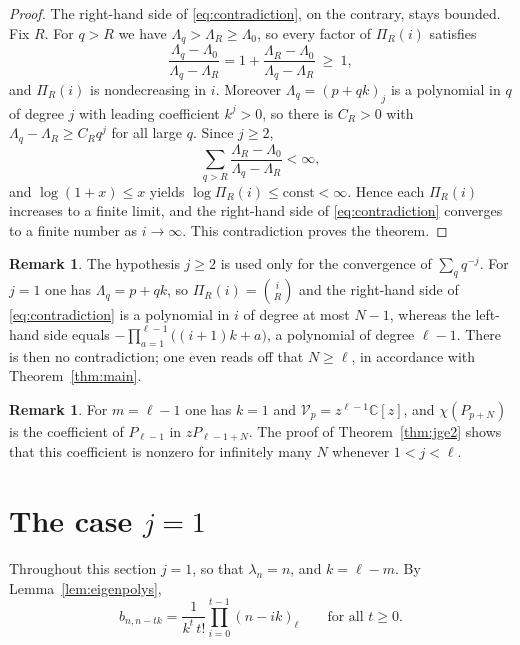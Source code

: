 \documentclass{amsart}
\theoremstyle{definition}
\newtheorem{remark}[theorem]{Remark}
\newcommand{\C}{\mathbb C}
\newcommand{\fall}[2]{(#1)_{#2}}
\begin{document}
\begin{proof}
The right-hand side of \eqref{eq:contradiction}, on the contrary, stays
bounded.  Fix \(R\).  For \(q>R\) we have \(\Lambda_q>\Lambda_R\ge\Lambda_0\),
so every factor of \(\Pi_R(i)\) satisfies
\[
\frac{\Lambda_q-\Lambda_0}{\Lambda_q-\Lambda_R}
=1+\frac{\Lambda_R-\Lambda_0}{\Lambda_q-\Lambda_R}\ \ge\ 1,
\]
and \(\Pi_R(i)\) is nondecreasing in \(i\).  Moreover
\(\Lambda_q=\fall{p+qk}{j}\) is a polynomial in \(q\) of degree \(j\) with
leading coefficient \(k^j>0\), so there is \(C_R>0\) with
\(\Lambda_q-\Lambda_R\ge C_R q^{j}\) for all large \(q\).  Since \(j\ge2\),
\[
\sum_{q>R}\frac{\Lambda_R-\Lambda_0}{\Lambda_q-\Lambda_R}<\infty,
\]
and \(\log(1+x)\le x\) yields
\(\log\Pi_R(i)\le\text{const}<\infty\).  Hence each \(\Pi_R(i)\) increases to
a finite limit, and the right-hand side of \eqref{eq:contradiction} converges
to a finite number as \(i\to\infty\).  This contradiction proves the theorem.
\end{proof}

\begin{remark}\label{rem:boundary}
The hypothesis \(j\ge2\) is used only for the convergence of
\(\sum_q q^{-j}\).  For \(j=1\) one has \(\Lambda_q=p+qk\), so
\(\Pi_R(i)=\binom{i}{R}\) and the right-hand side of
\eqref{eq:contradiction} is a polynomial in \(i\) of degree at most
\(N-1\), whereas the left-hand side equals
\(-\prod_{a=1}^{\ell-1}\bigl((i+1)k+a\bigr)\), a polynomial of degree
\(\ell-1\).  There is then no contradiction; one even reads off that
\(N\ge\ell\), in accordance with Theorem~\ref{thm:main}.
\end{remark}

\begin{remark}
For \(m=\ell-1\) one has \(k=1\) and \(\mathcal V_p=z^{\ell-1}\C[z]\), and
\(\chi(P_{p+N})\) is the coefficient of \(P_{\ell-1}\) in
\(zP_{\ell-1+N}\).  The proof of Theorem~\ref{thm:jge2} shows that this
coefficient is nonzero for infinitely many \(N\) whenever \(1<j<\ell\).
\end{remark}

\section{The case \texorpdfstring{\(j=1\)}{j=1}}\label{sec:jone}

Throughout this section \(j=1\), so that \(\lambda_n=n\), and \(k=\ell-m\).
By Lemma~\ref{lem:eigenpolys},
\begin{equation}\label{eq:b-jone}
b_{n,n-tk}
=\frac{1}{k^t\,t!}\prod_{i=0}^{t-1}\fall{n-ik}{\ell}
\qquad\text{for all } t\ge0 .
\end{equation}
\end{document}
